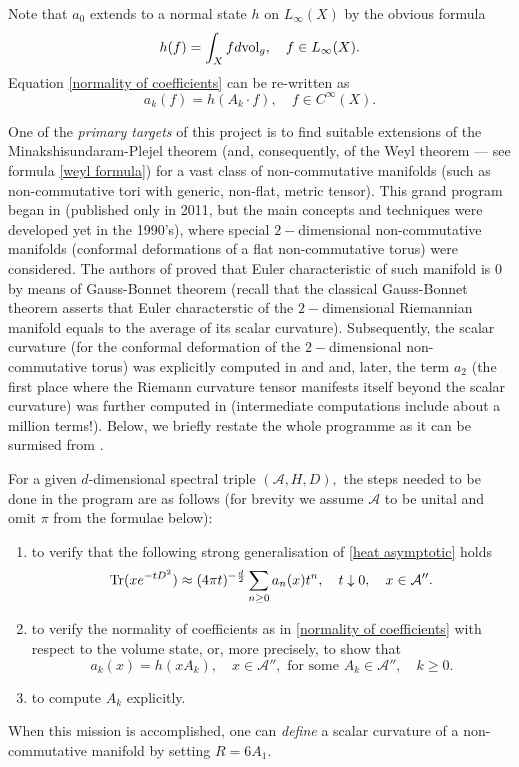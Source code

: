\documentclass[12pt]{article}
\begin{document}
Note that $a_0$ extends to a normal state $h$ on $L_{\infty}(X)$ by the obvious formula
$$h(f)=\int_X fd{\rm vol}_g,\quad f\in L_{\infty}(X).$$
Equation \eqref{normality of coefficients} can be re-written as
$$a_k(f)=h(A_k\cdot f),\quad f\in C^{\infty}(X).$$

One of the {\it primary targets} of this project is to find suitable extensions of the Minakshisundaram-Plejel theorem (and, consequently, of the Weyl theorem --- see formula \eqref{weyl formula}) for a vast class of non-commutative manifolds (such as non-commutative tori with generic, non-flat, metric tensor). This grand program began in \cite{ConnesTretkoff} (published only in 2011, but the main concepts and techniques were developed yet in the 1990's), where special $2-$dimensional non-commutative manifolds (conformal deformations of a flat non-commutative torus) were considered. The authors of \cite{ConnesTretkoff} proved that Euler characteristic of such manifold is $0$ by means of Gauss-Bonnet theorem (recall that the classical Gauss-Bonnet theorem asserts that Euler characterstic of the $2-$dimensional Riemannian manifold equals to the average of its scalar curvature). Subsequently, the scalar curvature (for the conformal deformation of the $2-$dimensional non-commutative torus) was explicitly computed in \cite{ConnesMoscovici_curvature} and \cite{FathizadehKhalkhali} and, later, the term $a_2$ (the first place where the Riemann curvature tensor manifests itself beyond the scalar curvature) was further computed in \cite{ConnesFathizadeh} (intermediate computations include about a million terms!). Below, we briefly restate the whole programme as it can be surmised from \cite{ConnesTretkoff}.



For a given $d$-dimensional spectral triple $(\mathcal{A},H,D),$ the steps needed to be done in the program are as follows (for brevity we assume $\mathcal{A}$ to be unital and omit $\pi$ from the formulae below):
\begin{enumerate}
\item\label{raph2} to verify that the following strong generalisation of \eqref{heat asymptotic} holds
$${\rm Tr}(xe^{-tD^2})\approx (4\pi t)^{-\frac{d}{2}} \sum_{n\geq0}a_n(x)t^n,\quad t\downarrow0,\quad x\in\mathcal{A}''.$$
\item\label{raph3} to verify the normality of coefficients as in \eqref{normality of coefficients} with respect to the volume state, or, more precisely, to show that
$$a_k(x)=h(xA_k),\quad x\in\mathcal{A}'',\mbox{ for some }A_k\in\mathcal{A}'',\quad k\geq0.$$
\item\label{raph4} to compute $A_k$ explicitly.
\end{enumerate}
When this mission is accomplished, one can {\it define} a scalar curvature of a non-commutative manifold by setting $R=6A_1.$
\end{document}
